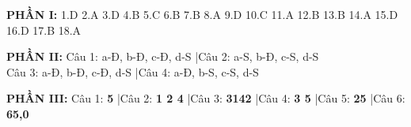 \documentclass[11pt,a4paper]{article}
\begin{document}
\vspace{0.1cm}
\noindent
\textbf{\color{mainGreen}PHẦN I:} 1.D \quad 2.A \quad 3.D \quad 4.B \quad 5.C \quad 6.B \quad 7.B \quad 8.A \quad 9.D \quad 10.C \quad 11.A \quad 12.B \quad 13.B \quad 14.A \quad 15.D \quad 16.D \quad 17.B \quad 18.A

\vspace{0.1cm}
\noindent
\textbf{\color{mainGreen}PHẦN II:} Câu 1: a-Đ, b-Đ, c-Đ, d-S \quad|\quad Câu 2: a-S, b-Đ, c-S, d-S\\
Câu 3: a-Đ, b-Đ, c-Đ, d-S \quad|\quad Câu 4: a-Đ, b-S, c-S, d-S

\vspace{0.1cm}
\noindent
\textbf{\color{mainGreen}PHẦN III:} Câu 1: \textbf{5} \quad|\quad Câu 2: \textbf{1 2 4} \quad|\quad Câu 3: \textbf{3142} \quad|\quad Câu 4: \textbf{3 5} \quad|\quad Câu 5: \textbf{25} \quad|\quad Câu 6: \textbf{65,0}

\end{document}

